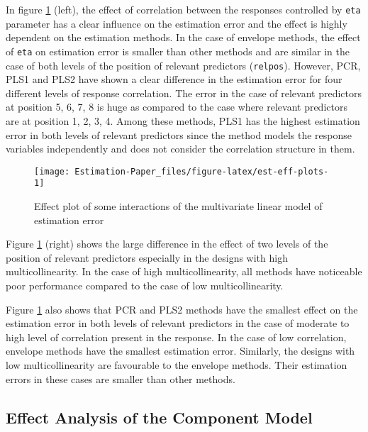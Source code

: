 \documentclass[12pt,3p,authoryear]{elsarticle}
\begin{document}
In figure \ref{fig:est-eff-plots} (left), the effect of correlation between the responses controlled by \texttt{eta} parameter has a clear influence on the estimation error and the effect is highly dependent on the estimation methods. In the case of envelope methods, the effect of \texttt{eta} on estimation error is smaller than other methods and are similar in the case of both levels of the position of relevant predictors (\texttt{relpos}). However, PCR, PLS1 and PLS2 have shown a clear difference in the estimation error for four different levels of response correlation. The error in the case of relevant predictors at position 5, 6, 7, 8 is huge as compared to the case where relevant predictors are at position 1, 2, 3, 4. Among these methods, PLS1 has the highest estimation error in both levels of relevant predictors since the method models the response variables independently and does not consider the correlation structure in them.



\begin{figure}
\texttt{[image: Estimation-Paper\_files/figure-latex/est-eff-plots-1]} \caption{Effect plot of some interactions of the multivariate linear model of estimation error}\label{fig:est-eff-plots}
\end{figure}

Figure \ref{fig:est-eff-plots} (right) shows the large difference in the effect of two levels of the position of relevant predictors especially in the designs with high multicollinearity. In the case of high multicollinearity, all methods have noticeable poor performance compared to the case of low multicollinearity.

Figure \ref{fig:est-eff-plots} also shows that PCR and PLS2 methods have the smallest effect on the estimation error in both levels of relevant predictors in the case of moderate to high level of correlation present in the response. In the case of low correlation, envelope methods have the smallest estimation error. Similarly, the designs with low multicollinearity are favourable to the envelope methods. Their estimation errors in these cases are smaller than other methods.

\hypertarget{effect-analysis-of-the-component-model}{%
\subsection{Effect Analysis of the Component Model}\label{effect-analysis-of-the-component-model}}
\end{document}
